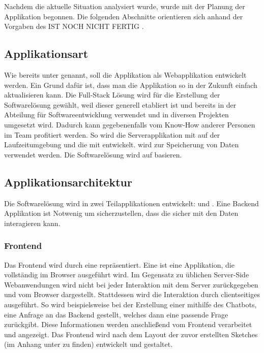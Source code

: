 Nachdem die aktuelle Situation analysiert wurde, wurde mit der Planung der Applikation begonnen. Die folgenden Abschnitte orientieren sich anhand der Vorgaben des \todo IST NOCH NICHT FERTIG .

\subsection{Applikationsart}

Wie bereits unter  genannt, soll die Applikation als Webapplikation entwickelt werden. Ein Grund dafür ist, dass man die Applikation so in der Zukunft
einfach aktualisieren kann. Die Full-Stack Lösung  wird für die Erstellung der Softwarelösung gewählt, weil dieser generell etabliert ist und bereits in der Abteilung für Softwareentwicklung verwendet und in diversen Projekten umgesetzt wird. Dadurch kann gegebenenfalls vom Know-How anderer Personen im Team profitiert werden. So wird die Serverapplikation mit  auf der Laufzeitumgebung  und die  mit  entwickelt. wird zur Speicherung von Daten verwendet werden. Die Softwarelösung wird auf  basieren.

\subsection{Applikationsarchitektur}
\label{sec:Planungsphase:Applikationsarchitektur}

Die Softwarelösung wird in zwei Teilapplikationen entwickelt:  und . Eine Backend Applikation ist Notwenig um sicherzustellen, dass die  sicher mit den Daten interagieren kann.

\subsubsection{Frontend}
\label{sec:Planungsphase:Frontend}

Das Frontend wird durch eine  repräsentiert. Eine  ist eine Applikation, die vollständig im Browser ausgeführt wird.  Im Gegensatz zu üblichen Server-Side Webanwendungen wird nicht bei jeder Interaktion mit dem Server  zurückgegeben und vom Browser dargestellt. Stattdessen wird die Interaktion durch clientseitiges  ausgeführt. 
So wird beispielsweise bei der Erstellung einer  mithilfe des Chatbots, eine Anfrage an das Backend gestellt, welches dann eine passende Frage zurückgibt. Diese Informationen werden anschließend vom Frontend verarbeitet und angezeigt.
Das Frontend wird nach dem Layout der zuvor erstellten Sketches (im Anhang unter  zu finden) entwickelt und gestaltet. 

